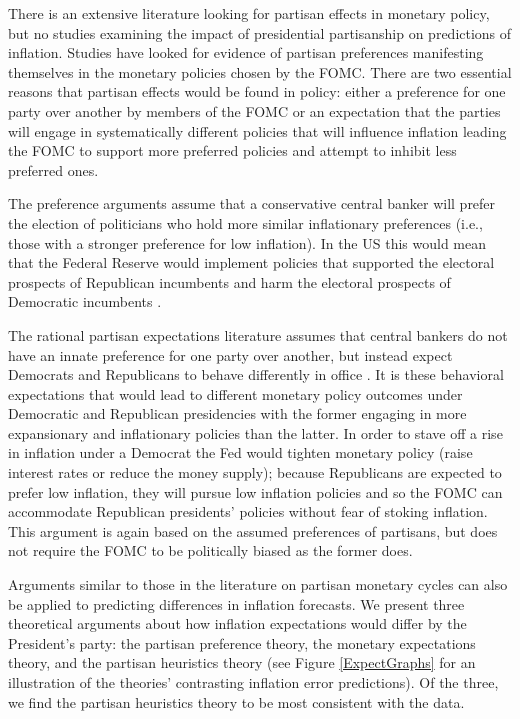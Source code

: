 \documentclass[a4paper]{article}\usepackage{graphicx, color}
\begin{document}
There is an extensive literature looking for partisan effects in monetary policy, but no studies examining the impact of presidential partisanship on predictions of inflation. Studies have looked for evidence of partisan preferences manifesting themselves in the monetary policies chosen by the FOMC. There are two essential reasons that partisan effects would be found in policy: either a preference for one party over another by members of the FOMC or an expectation that the parties will engage in systematically different policies that will influence inflation leading the FOMC to support more preferred policies and attempt to inhibit less preferred ones. 

The preference arguments assume that a conservative central banker will prefer the election of politicians who hold more similar inflationary preferences (i.e., those with a stronger preference for low inflation). In the US this would mean that the Federal Reserve would implement policies that supported the electoral prospects of Republican incumbents and harm the electoral prospects of Democratic incumbents \citep{Clark2012,Hakes1988,Sieg1997,Tootell1996}.

The rational partisan expectations literature assumes that central bankers do not have an innate preference for one party over another, but instead expect Democrats and Republicans to behave differently in office \citep{Alesina1991,Hibbs1994}. It is these behavioral expectations that would lead to different monetary policy outcomes under Democratic and Republican presidencies with the former engaging in more expansionary and inflationary policies than the latter. In order to stave off a rise in inflation under a Democrat the Fed would tighten monetary policy (raise interest rates or reduce the money supply); because Republicans are expected to prefer low inflation, they will pursue low inflation policies and so the FOMC can accommodate Republican presidents' policies without fear of stoking inflation. This argument is again based on the assumed preferences of partisans, but does not require the FOMC to be politically biased as the former does. 

Arguments similar to those in the literature on partisan monetary cycles can also be applied to predicting differences in inflation forecasts. We present three theoretical arguments about how inflation expectations would differ by the President's party: the partisan preference theory, the monetary expectations theory, and the partisan heuristics theory (see Figure \ref{ExpectGraphs} for an illustration of the theories' contrasting inflation error predictions). Of the three, we find the partisan heuristics theory to be most consistent with the data.
\end{document}
